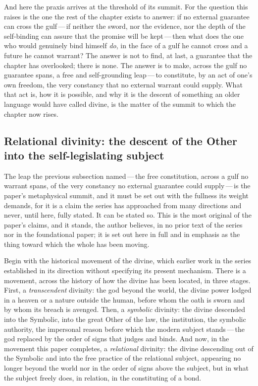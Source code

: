 And here the praxis arrives at the threshold of its summit. For the question this raises is the one the rest of the chapter exists to answer: if no external guarantee can cross the gulf\,---\,if neither the sword, nor the evidence, nor the depth of the self-binding can assure that the promise will be kept\,---\,then what does the one who would genuinely bind himself \emph{do}, in the face of a gulf he cannot cross and a future he cannot warrant? The answer is not to find, at last, a guarantee that the chapter has overlooked; there is none. The answer is to make, across the gulf no guarantee spans, a free and self-grounding leap\,---\,to constitute, by an act of one's own freedom, the very constancy that no external warrant could supply. What that act is, how it is possible, and why it is the descent of something an older language would have called divine, is the matter of the summit to which the chapter now rises.

\subsection{Relational divinity: the descent of the Other into the self-legislating subject}
\label{p13:sub:prax-divinity}

\noindent
The leap the previous subsection named\,---\,the free constitution, across a gulf no warrant spans, of the very constancy no external guarantee could supply\,---\,is the paper's metaphysical summit, and it must be set out with the fullness its weight demands, for it is a claim the series has approached from many directions and never, until here, fully stated. It can be stated so.  This is the most original of the paper's claims, and it stands, the author believes, in no prior text of the series nor in the foundational paper; it is set out here in full and in emphasis as the thing toward which the whole has been moving.

Begin with the historical movement of the divine, which earlier work in the series established in its direction without specifying its present mechanism. There is a movement, across the history of how the divine has been located, in three stages. First, a \emph{transcendent} divinity: the god beyond the world, the divine power lodged in a heaven or a nature outside the human, before whom the oath is sworn and by whom its breach is avenged. Then, a \emph{symbolic} divinity: the divine descended into the Symbolic, into the great Other of the law, the institution, the symbolic authority, the impersonal reason before which the modern subject stands\,---\,the god replaced by the order of signs that judges and binds. And now, in the movement this paper completes, a \emph{relational} divinity: the divine descending out of the Symbolic and into the free practice of the relational subject, appearing no longer beyond the world nor in the order of signs above the subject, but in what the subject freely does, in relation, in the constituting of a bond.

